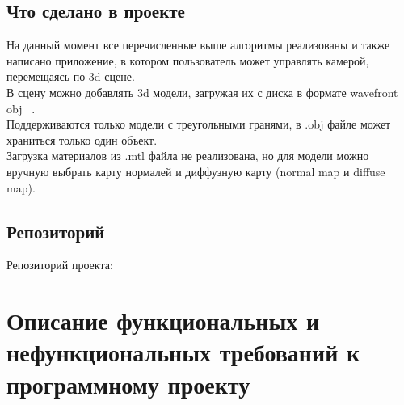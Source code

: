 \documentclass{article}
\begin{document}
\subsection{Что сделано в проекте}
На данный момент все перечисленные выше алгоритмы реализованы и также написано приложение, в котором пользователь может управлять камерой, перемещаясь по 3d сцене. \\
В сцену можно добавлять 3d модели, загружая их с диска в формате wavefront obj ~\cite{obj}. \\
Поддерживаются только модели с треугольными гранями, в .obj файле может храниться только один объект. \\
Загрузка материалов из .mtl файла не реализована, но для модели можно вручную выбрать карту нормалей и диффузную карту (normal map и diffuse map).

\subsection {Репозиторий}
Репозиторий проекта: ~\cite{3dRenderer}


\pagebreak

\section{Описание функциональных и нефункциональных требований к программному проекту}

\end{document}
